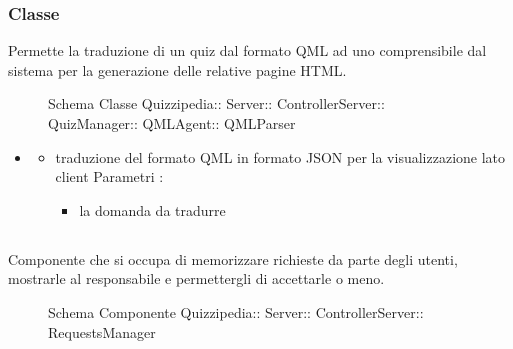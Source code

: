 \subsubsection{Classe }
Permette la traduzione di un quiz dal formato QML ad uno comprensibile dal sistema per la generazione delle relative pagine HTML.
\begin{figure}[H]
\centering
\noindent{}
\caption[Schema Classe QMLParser]{Schema Classe Quizzipedia:: Server:: ControllerServer:: QuizManager:: QMLAgent:: QMLParser}
\end{figure}
\begin{itemize}
\item {}
\begin{itemize}
\item {}
\newline
traduzione del formato QML in formato JSON per la visualizzazione lato client
\newline
Parametri :
\begin{itemize}
\item {}
\newline
la domanda da tradurre
\end{itemize}
\end{itemize}
\end{itemize}
\subsection{}
Componente che si occupa di memorizzare richieste da parte degli utenti, mostrarle al responsabile e permettergli di accettarle o meno.
\begin{figure}[H]
\centering
\noindent{}
\caption[Schema Componente RequestsManager]{Schema Componente Quizzipedia:: Server:: ControllerServer:: RequestsManager}
\end{figure}
